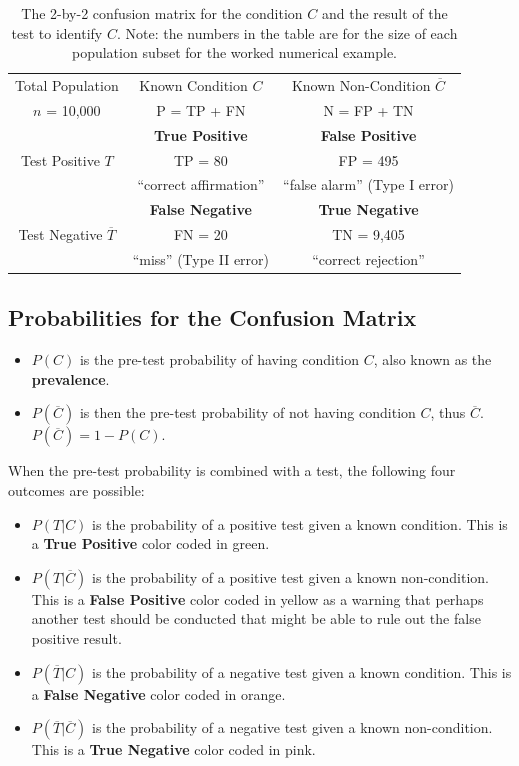 \begin{table}[htb]
\caption{The 2-by-2 confusion matrix for the condition $C$ 
and the result of the test to identify $C$.  Note: the numbers
in the table are for the size of each population subset for
the worked numerical example.}
\label{tab:breast_cancer}
\centering
\begin{tabular}{|c|c|c|} \hline
Total Population & 
Known Condition $C$&
Known Non-Condition $\overline{C}$ \\ 
$n$ = 10,000 & 
P = TP + FN & 
N = FP + TN \\ \hline \hline
& 
\colorbox{greenfaded}{\bf True Positive} & 
\colorbox{yellowfaded}{\bf False Positive} \\
Test Positive $T$ & TP = 80 & FP = 495 \\
& ``correct affirmation'' 
& ``false alarm'' (Type I error) \\ \hline
& 
\colorbox{horange} {\bf False Negative} & 
\colorbox{redfaded} {\bf True Negative} \\
Test Negative $\overline{T}$ & FN = 20 & TN = 9,405 \\ 
& ``miss'' (Type II error) & ``correct rejection'' \\ \hline
\end{tabular}
\end{table}

\subsection{Probabilities for the Confusion Matrix}
\begin{itemize}
\item $P(C)$ is the pre-test probability of having condition $C$, 
also known as the {\bf prevalence}.
\item $P(\overline{C})$ is then the pre-test probability of not 
having condition $C$, thus $\overline{C}$.
$P(\overline{C}) = 1 - P(C)$.
\end{itemize} 

When the pre-test probability is 
combined with a test, the following 
four outcomes are possible:
\begin{itemize}
\item $P(T|C)$ is the probability of a positive test given a 
known condition.  This is a 
\colorbox{greenfaded}{\bf True Positive} color coded in green.
\item $P(T|\overline{C})$ is the probability of a positive test 
given a known non-condition.  
This is a 
\colorbox{yellowfaded}{\bf False Positive} color coded 
in yellow as a warning
that perhaps another test should be conducted that 
might be able to
rule out the false positive result.
\item $P(\overline{T}|C)$ is the probability of a negative test 
given a known condition.  This is a 
\colorbox{horange}{\bf False Negative} color coded in orange.
\item $P(\overline{T}|\overline{C})$ is the probability of a 
negative test given a known non-condition.   
This is a 
\colorbox{redfaded}{\bf True Negative} color coded in pink.
\end{itemize}

